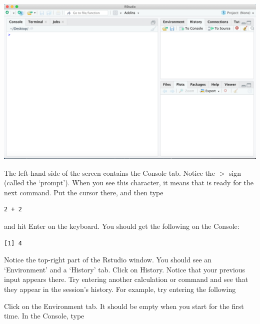 \begin{center}\includegraphics[width=0.8\linewidth]{images/RstudioMain} \end{center}

The left-hand side of the screen contains the Console tab. Notice the \(>\) sign (called the `prompt'). When you see this character, it means that \R is ready for the next command. Put the cursor there, and then type

\begin{verbatim}
2 + 2
\end{verbatim}

and hit Enter on the keyboard. You should get the following on the Console:

\begin{verbatim}
[1] 4
\end{verbatim}

Notice the top-right part of the Rstudio window. You should see an `Environment' and a `History' tab. Click on History. Notice that your previous input appears there. Try entering another calculation or command and see that they appear in the session's history. For example, try entering the following

\begin{Shaded}
\begin{Highlighting}[]
 \SpecialCharTok{\^{}} 
\NormalTok{()}
\end{Highlighting}
\end{Shaded}

Click on the Environment tab. It should be empty when you start \R for the first time. In the Console, type

\begin{Shaded}
\begin{Highlighting}[]
\OtherTok{\textless{}{-}} \NormalTok{(}\NormalTok{)}
\end{Highlighting}
\end{Shaded}

